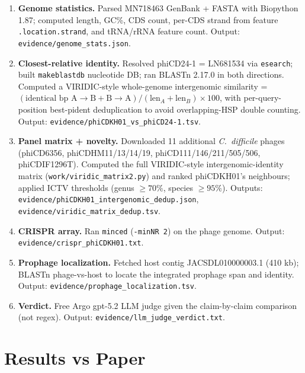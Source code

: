 \documentclass[11pt]{article}
\begin{document}
\begin{enumerate}[leftmargin=1.5em]
  \item \textbf{Genome statistics.} Parsed MN718463 GenBank + FASTA with
        Biopython 1.87; computed length, GC\%, CDS count, per-CDS strand
        from feature \texttt{.location.strand}, and tRNA/rRNA feature count.
        Output: \texttt{evidence/genome\_stats.json}.
  \item \textbf{Closest-relative identity.} Resolved phiCD24-1 = LN681534
        via \texttt{esearch}; built \texttt{makeblastdb} nucleotide DB; ran
        BLASTn 2.17.0 in both directions. Computed a VIRIDIC-style
        whole-genome intergenomic similarity =
        $(\text{identical bp A}\!\to\!\text{B} + \text{B}\!\to\!\text{A}) /
        (\text{len}_A + \text{len}_B) \times 100$, with per-query-position
        best-pident deduplication to avoid overlapping-HSP double counting.
        Output: \texttt{evidence/phiCDKH01\_vs\_phiCD24-1.tsv}.
  \item \textbf{Panel matrix + novelty.} Downloaded 11 additional
        \emph{C.\ difficile} phages (phiCD6356, phiCDHM11/13/14/19,
        phiCD111/146/211/505/506, phiCDIF1296T). Computed the full
        VIRIDIC-style intergenomic-identity matrix
        (\texttt{work/viridic\_matrix2.py}) and ranked phiCDKH01's neighbours;
        applied ICTV thresholds (genus $\geq 70\%$, species $\geq 95\%$).
        Outputs: \texttt{evidence/phiCDKH01\_intergenomic\_dedup.json},
        \texttt{evidence/viridic\_matrix\_dedup.tsv}.
  \item \textbf{CRISPR array.} Ran \texttt{minced} (\texttt{-minNR 2}) on the
        phage genome. Output: \texttt{evidence/crispr\_phiCDKH01.txt}.
  \item \textbf{Prophage localization.} Fetched host contig JACSDL010000003.1
        (410 kb); BLASTn phage-vs-host to locate the integrated prophage
        span and identity. Output: \texttt{evidence/prophage\_localization.tsv}.
  \item \textbf{Verdict.} Free Argo gpt-5.2 LLM judge given the claim-by-claim
        comparison (not regex). Output: \texttt{evidence/llm\_judge\_verdict.txt}.
\end{enumerate}

\section{Results vs Paper}
\end{document}
